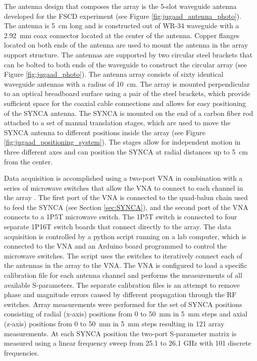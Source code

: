 The antenna design that composes the array is the 5-slot waveguide antenna developed for the FSCD experiment (see Figure \ref{fig:jugaad_antenna_photo}). The antenna is 5~cm long and is constructed out of WR-34 waveguide with a 2.92~mm coax connector located at the center of the antenna. Copper flanges located on both ends of the antenna are used to mount the antenna in the array support structure. The antennas are supported by two circular steel brackets that can be bolted to both ends of the waveguide to construct the circular array (see Figure \ref{fig:jugaad_photo}). The antenna array consists of sixty identical waveguide antennas with a radius of 10~cm. The array  is mounted perpendicular to an optical breadboard surface using a pair of the steel brackets, which provide sufficient space for the coaxial cable connections and allows for easy positioning of the SYNCA antenna. The SYNCA is mounted on the end of a carbon fiber rod attached to a set of manual translation stages, which are used to move the SYNCA antenna to different positions inside the array (see Figure \ref{fig:jugaad_positioning_system}). The stages allow for independent motion in three different axes and can position the SYNCA at radial distances up to 5~cm from the center.

Data acquisition is accomplished using a two-port VNA in combination with a series of microwave switches that allow the VNA to connect to each channel in the array .  The first port of the VNA is connected to the quad-balun chain used to feed the SYNCA (see Section \ref{sec:SYNCA}), and the second port of the VNA connects to a 1P5T microwave switch. The 1P5T switch is connected to four separate 1P16T switch boards that connect directly to the array. The data acquisition is controlled by a python script running on a lab computer, which is connected to the VNA and an Arduino board programmed to control the microwave switches. The script uses the switches to iteratively connect each of the antennas in the array to the VNA. The VNA is configured to load a specific calibration file for each antenna channel and performs the measurements of all available S-parameters. The separate calibration files is an attempt to remove phase and magnitude errors caused by different propagation through the RF switches. Array measurements were performed for the set of SYNCA positions consisting of radial (x-axis) positions from 0 to 50~mm in 5~mm steps and axial (z-axis) positions from 0 to 50~mm in 5~mm steps resulting in 121 array measurements. At each SYNCA position the two-port S-parameter matrix is measured using a linear frequency sweep from 25.1 to 26.1 GHz with 101 discrete frequencies.

